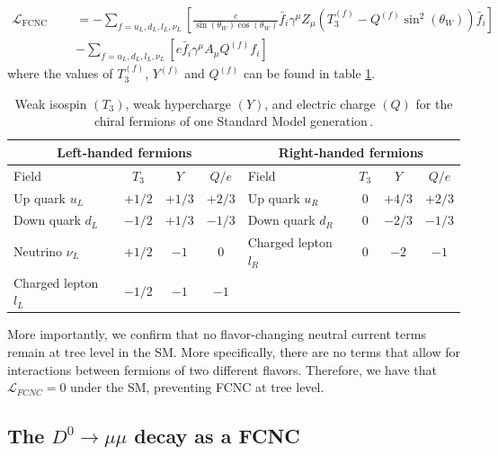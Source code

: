 \begin{equation}
\begin{split}
\mathcal{L}_{\text{FCNC Candidates}} &= -\sum_{f = u_{L},d_{L},l_{L}, \nu_{L}} \left[\frac{e}{\sin(\theta_{W})\cos(\theta_{W})} \bar{f}_{i}\gamma^\mu Z_{\mu}\left(T_{3}^{(f)} -Q^{(f)}\sin^2(\theta_{W})\right)\bar{f}_{i}\right]\\
&- \sum_{f = u_{L},d_{L},l_{L}, \nu_{L}} \left[ e \bar{f}_{i}\gamma^\mu A_{\mu}Q^{(f)}f_{i}\right]
\end{split}
\end{equation}
where the values of $T_3^{(f)}$, $Y^{(f)}$ and $Q^{(f)}$ can be found in table \ref{tab:ew_charges}. 


\begin{table}[htbp]
    \centering
    \begin{tabular}{|lccc|lccc|}
      \hline
      \multicolumn{4}{|c|}{\textbf{Left‑handed fermions}} &
      \multicolumn{4}{c|}{\textbf{Right‑handed fermions}} \\
      \hline
      Field & $T_3$ & $Y$ & $Q/e$ &
      Field & $T_3$ & $Y$ & $Q/e$ \\
      \hline
      Up quark $u_L$        & $+1/2$ & $+1/3$ & $+2/3$ &
      Up quark $u_R$        & $0$    & $+4/3$ & $+2/3$ \\
      Down quark $d_L$      & $-1/2$ & $+1/3$ & $-1/3$ &
      Down quark $d_R$      & $0$    & $-2/3$ & $-1/3$ \\
      Neutrino $\nu_L$      & $+1/2$ & $-1$   & $0$    &
      Charged lepton $l_R$  & $0$    & $-2$   & $-1$   \\
      Charged lepton $l_L$  & $-1/2$ & $-1$   & $-1$   &
                            &        &        &        \\
      \hline
    \end{tabular}
    \caption{Weak isospin $(T_3)$, weak hypercharge $(Y)$, and electric
             charge $(Q)$ for the chiral fermions of one Standard Model
             generation\,\cite{ref:pdg2024}.}
    \label{tab:ew_charges}
  \end{table}
  
  

More importantly, we confirm that no flavor-changing neutral current terms remain at tree level in the SM. More specifically, there are no terms that allow for interactions between fermions of two different flavors. Therefore, we have that $\mathcal{L}_{FCNC} = 0$ under the SM, preventing FCNC at tree level. 

\subsection{The $D^0 \to \mu \mu$ decay as a FCNC}

